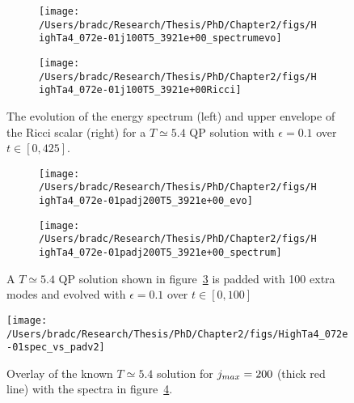 \documentclass[../PhD.tex]{subfiles}
\begin{document}
\begin{figure}[H]
	\begin{subfigure}[t]{0.48\textwidth}
		\texttt{[image: /Users/bradc/Research/Thesis/PhD/Chapter2/figs/HighTa4\_072e-01j100T5\_3921e+00\_spectrumevo]}
		\label{fig: HighTa4_072e-01j100T5_3921e+00_spectrumevo}
	\end{subfigure}
	\:
	\begin{subfigure}[t]{0.48\textwidth}
		\texttt{[image: /Users/bradc/Research/Thesis/PhD/Chapter2/figs/HighTa4\_072e-01j100T5\_3921e+00Ricci]}
		\label{fig: HighTa4_072e-01j100T5_3921e+00Ricci}
	\end{subfigure}
	\caption[Evolution of the energy spectrum and Ricci scalar for a $T \simeq 5.4$ QP solution]{The evolution of the energy spectrum (left) and upper envelope of the Ricci scalar (right) for a $T \simeq 5.4$ QP solution with $\epsilon = 0.1$ over $t \in [0, 425]$.}
	\label{fig:HighTa4_072e-01j100T5_3921e+00_evo}	
\end{figure}

\begin{figure}[h]
	\centering
	\begin{subfigure}[t]{0.45\textwidth}
		\texttt{[image: /Users/bradc/Research/Thesis/PhD/Chapter2/figs/HighTa4\_072e-01padj200T5\_3921e+00\_evo]}
	\end{subfigure}
	\;
	\begin{subfigure}[t]{0.45\textwidth}
		\texttt{[image: /Users/bradc/Research/Thesis/PhD/Chapter2/figs/HighTa4\_072e-01padj200T5\_3921e+00\_spectrum]}
	\end{subfigure}
	\caption[Evolution of the spectrum of a $T \simeq 5.4$ QP solution that has been padded with $100$ modes]{A $T \simeq 5.4$ QP solution shown in figure~\ref{fig:HighTa4_072e-01j100T5_3921e+00_evo} is padded with 100 extra modes and evolved with $\epsilon = 0.1$ over $t \in [0, 100]$}
	\label{fig: HighTa4_072e-01padj200T5_3921e+00_evo}
\end{figure}

\begin{figure}[ht]
	\centering
	\texttt{[image: /Users/bradc/Research/Thesis/PhD/Chapter2/figs/HighTa4\_072e-01spec\_vs\_padv2]}
	\caption[Comparison between a attracor solution with $j_{max} = 200$ and the evolution of a $j_{max} = 100$, $T \simeq 5.4$ solution that has been padded by $100$ modes]{Overlay of the known $T \simeq 5.4$ solution for $j_{max} = 200$ (thick red line) with the spectra in figure~\ref{fig: HighTa4_072e-01padj200T5_3921e+00_evo}.}
	\label{fig: HighTa4_072e-01spec_vs_pad}
\end{figure}
\end{document}
